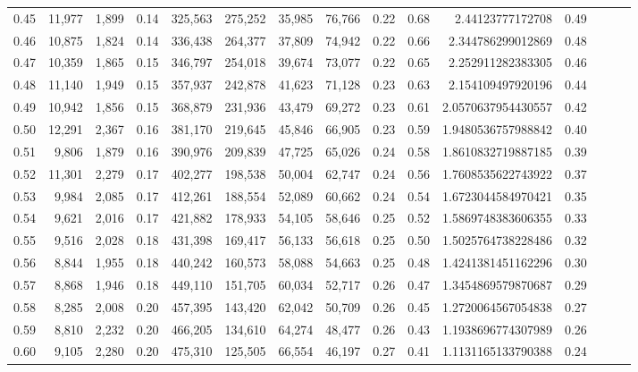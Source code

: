 \begin{tabular}{rrrrrrrrrrrrrrr}
0.45 &  11,977 &  1,899 &  0.14 &  325,563 &  275,252 &   35,985 &   76,766 &  0.22 &  0.68 &      2.44123777172708 &      0.49 \\
0.46 &  10,875 &  1,824 &  0.14 &  336,438 &  264,377 &   37,809 &   74,942 &  0.22 &  0.66 &     2.344786299012869 &      0.48 \\
0.47 &  10,359 &  1,865 &  0.15 &  346,797 &  254,018 &   39,674 &   73,077 &  0.22 &  0.65 &     2.252911282383305 &      0.46 \\
0.48 &  11,140 &  1,949 &  0.15 &  357,937 &  242,878 &   41,623 &   71,128 &  0.23 &  0.63 &     2.154109497920196 &      0.44 \\
0.49 &  10,942 &  1,856 &  0.15 &  368,879 &  231,936 &   43,479 &   69,272 &  0.23 &  0.61 &    2.0570637954430557 &      0.42 \\
0.50 &  12,291 &  2,367 &  0.16 &  381,170 &  219,645 &   45,846 &   66,905 &  0.23 &  0.59 &    1.9480536757988842 &      0.40 \\
0.51 &   9,806 &  1,879 &  0.16 &  390,976 &  209,839 &   47,725 &   65,026 &  0.24 &  0.58 &    1.8610832719887185 &      0.39 \\
0.52 &  11,301 &  2,279 &  0.17 &  402,277 &  198,538 &   50,004 &   62,747 &  0.24 &  0.56 &    1.7608535622743922 &      0.37 \\
0.53 &   9,984 &  2,085 &  0.17 &  412,261 &  188,554 &   52,089 &   60,662 &  0.24 &  0.54 &    1.6723044584970421 &      0.35 \\
0.54 &   9,621 &  2,016 &  0.17 &  421,882 &  178,933 &   54,105 &   58,646 &  0.25 &  0.52 &    1.5869748383606355 &      0.33 \\
0.55 &   9,516 &  2,028 &  0.18 &  431,398 &  169,417 &   56,133 &   56,618 &  0.25 &  0.50 &    1.5025764738228486 &      0.32 \\
0.56 &   8,844 &  1,955 &  0.18 &  440,242 &  160,573 &   58,088 &   54,663 &  0.25 &  0.48 &    1.4241381451162296 &      0.30 \\
0.57 &   8,868 &  1,946 &  0.18 &  449,110 &  151,705 &   60,034 &   52,717 &  0.26 &  0.47 &    1.3454869579870687 &      0.29 \\
0.58 &   8,285 &  2,008 &  0.20 &  457,395 &  143,420 &   62,042 &   50,709 &  0.26 &  0.45 &    1.2720064567054838 &      0.27 \\
0.59 &   8,810 &  2,232 &  0.20 &  466,205 &  134,610 &   64,274 &   48,477 &  0.26 &  0.43 &    1.1938696774307989 &      0.26 \\
0.60 &   9,105 &  2,280 &  0.20 &  475,310 &  125,505 &   66,554 &   46,197 &  0.27 &  0.41 &    1.1131165133790388 &      0.24 \\

\end{tabular}
